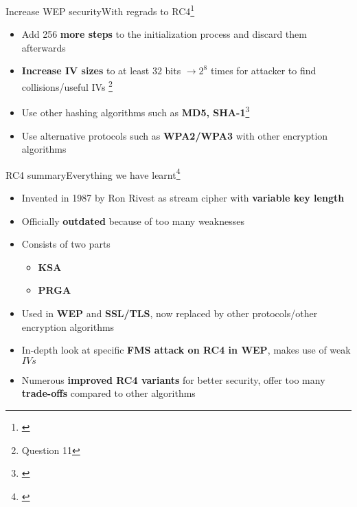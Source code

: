 \documentclass[
	aspectratio=169,	%
	onlytextwidth,		%
	t					%
	]{beamer}
\begin{document}
\begin{frame}[fragile]{Increase WEP security}{With regrads to RC4\footnote[frame]{\cite{wepcracking}}}
	\begin{itemize}
		\item Add 256 \textbf{more steps} to the initialization process and discard them afterwards
		\item \textbf{Increase IV sizes} to at least $32$ bits $\rightarrow 2^{8}$ times for attacker to find collisions/useful IVs \footnote[frame]{\footnotesize Question 11}
		\item Use other hashing algorithms such as \textbf{MD5, SHA-1}\footnote[frame]{\cite{wepproblems}}
		\item Use alternative protocols such as \textbf{WPA2/WPA3} with other encryption algorithms
	\end{itemize}
\end{frame}

\begin{frame}[fragile]{RC4 summary}{Everything we have learnt\footnote[frame]{\cite{stamp2007applied}}}
	\begin{itemize}
		\item Invented in 1987 by Ron Rivest as stream cipher with \textbf{variable key length}
		\item Officially \textbf{outdated} because of too many weaknesses
		\item Consists of two parts
		\begin{itemize}
			\item \textbf{KSA}
			\item \textbf{PRGA}
		\end{itemize}
		\item Used in \textbf{WEP} and \textbf{SSL/TLS}, now replaced by other protocols/other encryption algorithms
		\item In-depth look at specific \textbf{FMS attack on RC4 in WEP}, makes use of weak $IVs$
		\item Numerous \textbf{improved RC4 variants} for better security, offer too many \textbf{trade-offs} compared to other algorithms
	\end{itemize}
\end{frame}

\appendix

\makethankyou

\begin{frame}[allowframebreaks]
	\printbibliography
\end{frame}
\end{document}
